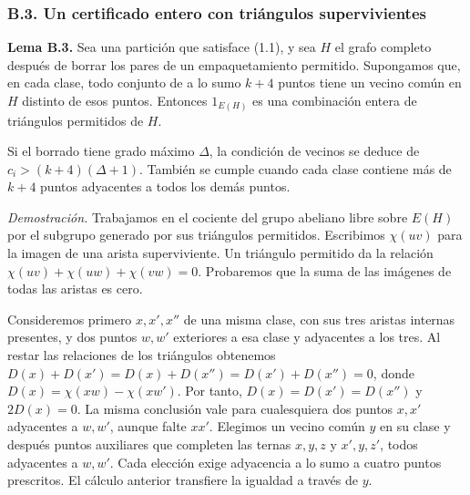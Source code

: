 \documentclass[spanish,11pt,a4paper]{article}
\begin{document}
\subsubsection{B.3. Un certificado entero con triángulos supervivientes}\label{b.3.-un-certificado-entero-con-triuxe1ngulos-supervivientes}

\textbf{Lema B.3.} Sea una partición que satisface (1.1), y sea \(H\) el grafo completo después de borrar los pares de un empaquetamiento permitido. Supongamos que, en cada clase, todo conjunto de a lo sumo \(k+4\) puntos tiene un vecino común en \(H\) distinto de esos puntos. Entonces \(1_{E(H)}\) es una combinación entera de triángulos permitidos de \(H\).

Si el borrado tiene grado máximo \(\Delta\), la condición de vecinos se deduce de \(c_i>(k+4)(\Delta+1)\). También se cumple cuando cada clase contiene más de \(k+4\) puntos adyacentes a todos los demás puntos.

\emph{Demostración.} Trabajamos en el cociente del grupo abeliano libre sobre \(E(H)\) por el subgrupo generado por sus triángulos permitidos. Escribimos \(\chi(uv)\) para la imagen de una arista superviviente. Un triángulo permitido da la relación \(\chi(uv)+\chi(uw)+\chi(vw)=0\). Probaremos que la suma de las imágenes de todas las aristas es cero.

Consideremos primero \(x,x',x''\) de una misma clase, con sus tres aristas internas presentes, y dos puntos \(w,w'\) exteriores a esa clase y adyacentes a los tres. Al restar las relaciones de los triángulos obtenemos \(D(x)+D(x')=D(x)+D(x'')=D(x')+D(x'')=0\), donde \(D(x)=\chi(xw)-\chi(xw')\). Por tanto, \(D(x)=D(x')=D(x'')\) y \(2D(x)=0\). La misma conclusión vale para cualesquiera dos puntos \(x,x'\) adyacentes a \(w,w'\), aunque falte \(xx'\). Elegimos un vecino común \(y\) en su clase y después puntos auxiliares que completen las ternas \(x,y,z\) y \(x',y,z'\), todos adyacentes a \(w,w'\). Cada elección exige adyacencia a lo sumo a cuatro puntos prescritos. El cálculo anterior transfiere la igualdad a través de \(y\).
\end{document}
